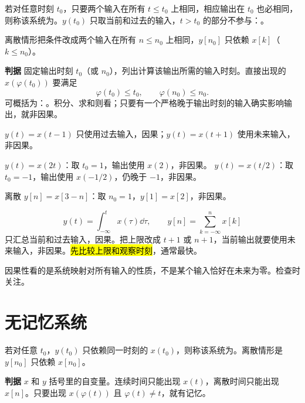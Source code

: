 \begin{definition}[因果系统]
  \label{def:causal-system}
  若对任意时刻 $t_0$，只要两个输入在所有 $t\le t_0$ 上相同，相应输出在 $t_0$ 也必相同，则称该系统为。$y(t_0)$ 只取当前和过去的输入，$t>t_0$ 的部分不参与：。

  离散情形把条件改成两个输入在所有 $n\le n_0$ 上相同，$y[n_0]$ 只依赖 $x[k]$（$k\le n_0$）。
\end{definition}

\noindent\textbf{判据}
固定输出时刻 $t_0$（或 $n_0$），列出计算该输出所需的输入时刻。直接出现的 $x(\varphi(t_0))$ 要满足
\[
  \varphi(t_0)\le t_0,
  \qquad
  \varphi(n_0)\le n_0.
\]
可概括为：。积分、求和则看；只要有一个严格晚于输出时刻的输入确实影响输出，就非因果。

\begin{example}[延迟、超前与时间缩放]
  $y(t)=x(t-1)$ 只使用过去输入，因果；$y(t)=x(t+1)$ 使用未来输入，非因果。

  $y(t)=x(2t)$：取 $t_0=1$，输出使用 $x(2)$，非因果。
  $y(t)=x(t/2)$：取 $t_0=-1$，输出使用 $x(-1/2)$，仍晚于 $-1$，非因果。

  离散 $y[n]=x[3-n]$：取 $n_0=1$，$y[1]=x[2]$，非因果。
\end{example}

\begin{example}[积分与累加的上限]
  \[
    y(t)=\int_{-\infty}^{t}x(\tau)\dd\tau,
    \qquad
    y[n]=\sum_{k=-\infty}^{n}x[k]
  \]
  只汇总当前和过去输入，因果。把上限改成 $t+1$ 或 $n+1$，当前输出就要使用未来输入，非因果。\hl{先比较上限和观察时刻}，通常最快。
\end{example}

因果性看的是系统映射对所有输入的性质，不是某个输入恰好在未来为零。检查时关注。

\section{无记忆系统}
\label{sec:memoryless-systems}

\begin{definition}[无记忆系统]
  \label{def:memoryless-system}
  若对任意 $t_0$，$y(t_0)$ 只依赖同一时刻的 $x(t_0)$，则称该系统为。离散情形是 $y[n_0]$ 只依赖 $x[n_0]$。
\end{definition}

\noindent\textbf{判据}
$x$ 和 $y$ 括号里的自变量。连续时间只能出现 $x(t)$，离散时间只能出现 $x[n]$。只要出现 $x(\varphi(t))$ 且 $\varphi(t)\ne t$，就有记忆。

